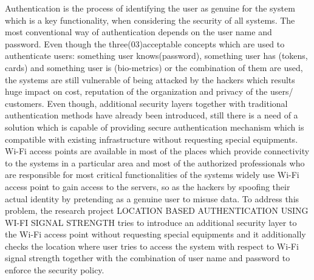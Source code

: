 Authentication is the process of identifying the user as genuine for the system
which is a key functionality, when considering the security of all systems. The
most conventional way of authentication depends on the user name and
password. Even though the three(03)acceptable concepts which are used to
authenticate users: something user knows(password), something user has (tokens, cards)
and something user is (bio-metrics) or the combination of them are used, the systems are
still vulnerable of being attacked by the hackers which results huge impact on
cost, reputation of the organization and privacy of the users/ customers.
Even though, additional security layers together with traditional authentication
methods have already been introduced, still there is a need of a solution which
is capable of providing secure authentication mechanism which is compatible
with existing infrastructure without requesting special equipments.
Wi-Fi access points are available in most of the places which provide connectivity
to the systems in a particular area and most of the authorized professionals who
are responsible for most critical functionalities of the systems widely use Wi-Fi access point to
gain access to the servers, so as the hackers by spoofing their actual identity by
pretending as a genuine user to misuse data.
To address this problem, the research project LOCATION BASED AUTHENTICATION USING WI-FI
SIGNAL STRENGTH tries to introduce an additional security layer to the Wi-Fi access point without
requesting special equipments and it additionally checks the location where user tries to access the system with respect to Wi-Fi signal strength together with the combination of user name and password to enforce the security policy.

